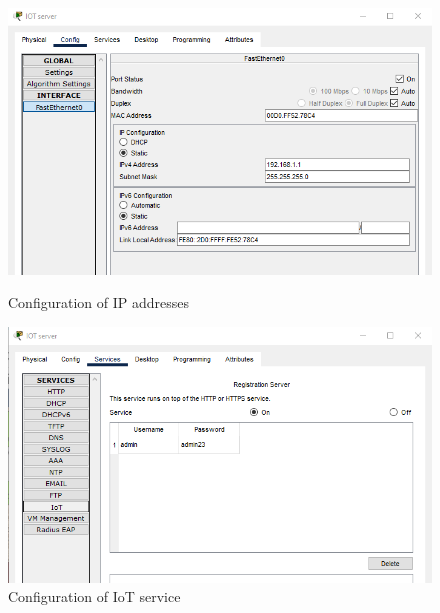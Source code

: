 \documentclass{report}
\begin{document}
\begin{figure}[h]
    \centering
    
    \begin{minipage}{0.45\textwidth}
    \centering
    \includegraphics[width=1\textwidth]{1s.png}
    \caption{Configuration of IP addresses}
    \label{fig:1}
    \end{minipage}
    \hfill
    \begin{minipage}{0.45\textwidth}
    \centering
    \includegraphics[width=1\textwidth]{2s.png}
    \caption{Configuration of IoT service}
    \label{fig:2}
    \end{minipage}  
\end{figure}
\newpage
\end{document}
